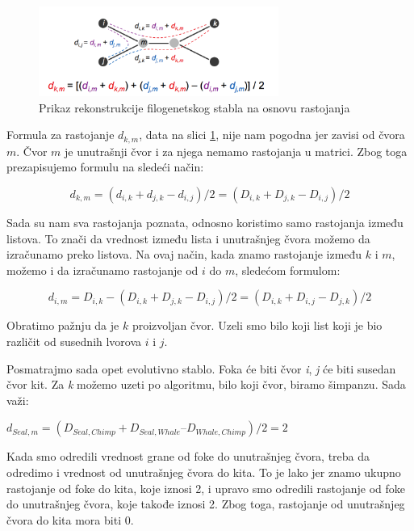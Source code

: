 \begin{figure}[h!]
\begin{center}
\includegraphics[width=0.7\textwidth]{poglavlja/7/slike/slika7.png}
\end{center}
\caption{Prikaz rekonstrukcije filogenetskog stabla na osnovu rastojanja}
\label{fig:filstab}
\end{figure}

Formula za rastojanje $d_{k, m}$, data na slici \ref{fig:filstab}, nije nam pogodna jer zavisi od čvora $m$. Čvor $m$ je unutrašnji čvor i za njega nemamo rastojanja u matrici. Zbog toga prezapisujemo formulu na sledeći način:

$$d_{k, m} = (d_{i, k} + d_{j, k} - d_{i, j}) / 2 = (D_{i, k} + D_{j, k} - D_{i, j}) / 2$$
 
Sada su nam sva rastojanja poznata, odnosno koristimo samo rastojanja između listova. To znači da vrednost između lista i unutrašnjeg čvora možemo da izračunamo preko listova. Na ovaj način, kada znamo rastojanje između $k$ i $m$, možemo i da izračunamo rastojanje od $i$ do $m$, sledećom formulom:

$$d_{i, m} = D_{i, k} - (D_{i, k} + D_{j, k} - D_{i, j}) / 2 = (D_{i, k} + D_{i, j} - D_{j, k}) / 2  $$

Obratimo pažnju da je $k$ proizvoljan čvor. Uzeli smo bilo koji list koji je bio različit od susednih lvorova $i$ i $j$.

Posmatrajmo sada opet evolutivno stablo. Foka \'ce biti \v{c}vor \textit{i}, \textit{j} \'ce biti susedan \v{c}vor kit. Za \textit{k} mo\v{z}emo uzeti po algoritmu, bilo koji \v{c}vor, biramo \v{s}impanzu. Sada va\v{z}i: 
\begin{center}
$d_{Seal, m} = (D_{Seal, Chimp} + D_{Seal, Whale} – D_{Whale, Chimp}) / 2 = 2$
\end{center}

Kada smo odredili vrednost grane od foke do unutrašnjeg čvora, treba da odredimo i vrednost od unutrašnjeg čvora do kita. To je lako jer znamo ukupno rastojanje od foke do kita, koje iznosi 2, i upravo smo odredili rastojanje od foke do unutrašnjeg čvora, koje takođe iznosi 2. Zbog toga, rastojanje od unutrašnjeg čvora do kita mora biti 0. 

